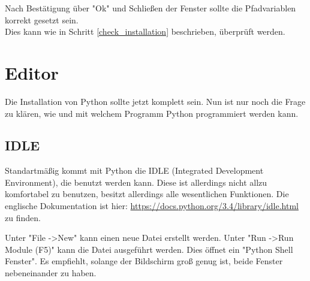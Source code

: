\documentclass[ngerman,oneside, a4letter]{article}
\begin{document}
\noindent Nach Bestätigung über "Ok" und Schließen der Fenster sollte die Pfadvariablen korrekt gesetzt sein.
\\
Dies kann wie in Schritt \ref{check_installation} beschrieben, überprüft werden.

\clearpage

\section{Editor}
Die Installation von Python sollte jetzt komplett sein. Nun ist nur noch die Frage zu klären, wie und mit welchem Programm Python programmiert werden kann.
\\
\subsection{IDLE}
Standartmäßig kommt mit Python die IDLE (Integrated Development Environment), die benutzt werden kann. Diese ist allerdings nicht allzu komfortabel zu benutzen, besitzt allerdings alle wesentlichen Funktionen. Die englische Dokumentation ist hier: \url{https://docs.python.org/3.4/library/idle.html} zu finden.
\begin{center}
\end{center}
Unter "File -\textgreater New" kann einen neue Datei erstellt werden. Unter "Run -\textgreater Run Module (F5)" kann die Datei ausgeführt werden. Dies öffnet ein "Python Shell Fenster". Es empfiehlt, solange der Bildschirm groß genug ist, beide Fenster nebeneinander zu haben.
\end{document}
